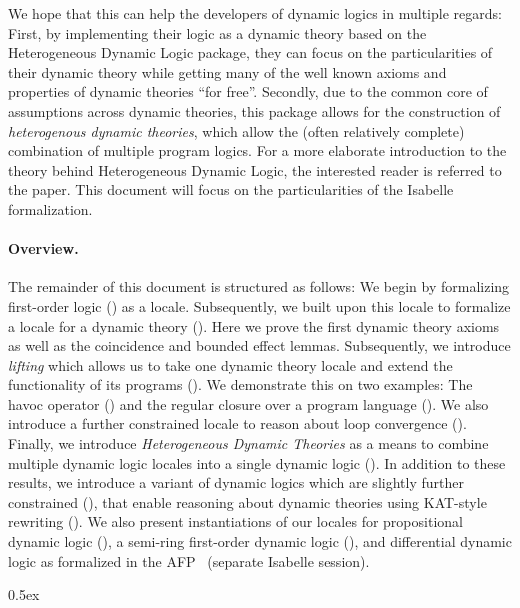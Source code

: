 \documentclass[11pt,a4paper]{article}
\begin{document}
We hope that this can help the developers of dynamic logics in multiple regards:
First, by implementing their logic as a dynamic theory based on the Heterogeneous Dynamic Logic package,
they can focus on the particularities of their dynamic theory while getting many
of the well known axioms and properties of dynamic theories ``for free''.
Secondly, due to the common core of assumptions across dynamic theories,
this package allows for the construction of \emph{heterogenous dynamic theories},
which allow the (often relatively complete) combination of multiple program logics.
For a more elaborate introduction to the theory behind Heterogeneous Dynamic Logic,
the interested reader is referred to the paper.
This document will focus on the particularities of the Isabelle formalization.

\paragraph{Overview.}
The remainder of this document is structured as follows:
We begin by formalizing first-order logic () as a locale.
Subsequently, we built upon this locale to formalize a locale for a
dynamic theory ().
Here we prove the first dynamic theory axioms as well
as the coincidence and bounded effect lemmas.
Subsequently, we introduce \emph{lifting} which allows us to take one
dynamic theory locale and extend the functionality of its programs
().
We demonstrate this on two examples: The havoc operator
() and the regular closure over a program language
().
We also introduce a further constrained locale to reason about loop convergence
().
Finally, we introduce \emph{Heterogeneous Dynamic Theories}
as a means to combine multiple dynamic logic locales into a
single dynamic logic ().
In addition to these results, we introduce a variant of dynamic logics
which are slightly further constrained (),
that enable reasoning about dynamic theories using
KAT-style rewriting ().
We also present instantiations of our locales for propositional dynamic logic
(),
a semi-ring first-order dynamic logic (),
and differential dynamic logic as formalized in the AFP~\cite{Differential_Dynamic_Logic-AFP}
(separate Isabelle session).

\tableofcontents

\parindent 0pt\parskip 0.5ex





\end{document}
